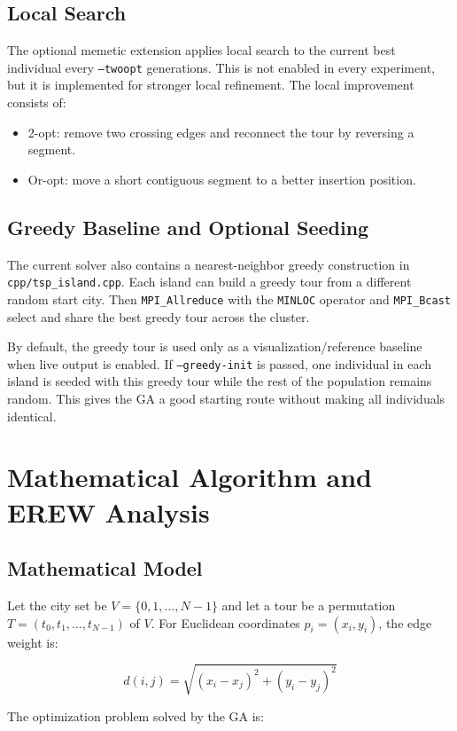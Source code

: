 \documentclass[11pt,a4paper]{article}
\begin{document}
\subsection{Local Search}
The optional memetic extension applies local search to the current best
individual every \texttt{--twoopt} generations. This is not enabled in every
experiment, but it is implemented for stronger local refinement. The local
improvement consists of:

\begin{itemize}[leftmargin=*]
  \item 2-opt: remove two crossing edges and reconnect the tour by reversing a
  segment.
  \item Or-opt: move a short contiguous segment to a better insertion position.
\end{itemize}

\subsection{Greedy Baseline and Optional Seeding}
The current solver also contains a nearest-neighbor greedy construction in
\texttt{cpp/tsp\_island.cpp}. Each island can build a greedy tour from a
different random start city. Then \texttt{MPI\_Allreduce} with the
\texttt{MINLOC} operator and \texttt{MPI\_Bcast} select and share the best
greedy tour across the cluster.

By default, the greedy tour is used only as a visualization/reference baseline
when live output is enabled. If \texttt{--greedy-init} is passed, one individual
in each island is seeded with this greedy tour while the rest of the population
remains random. This gives the GA a good starting route without making all
individuals identical.
\newpage

\section{Mathematical Algorithm and EREW Analysis}

\subsection{Mathematical Model}
Let the city set be $V=\{0,1,\ldots,N-1\}$ and let a tour be a permutation
$T=(t_0,t_1,\ldots,t_{N-1})$ of $V$. For Euclidean coordinates
$p_i=(x_i,y_i)$, the edge weight is:

\[
  d(i,j)=\sqrt{(x_i-x_j)^2+(y_i-y_j)^2}
\]

The optimization problem solved by the GA is:
\end{document}

